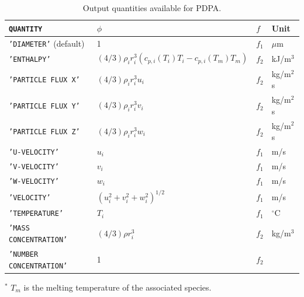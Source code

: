 \documentclass[11pt]{book}
\newcommand{\ct}{\tt\small}
\begin{document}
\begin{table}[!ht]
\caption[Output quantities available for PDPA]{Output quantities available for PDPA.}
\label{tbl:pdpa}
\begin{center}
\begin{tabular}{|l|l|l|l|}
\hline
{\ct QUANTITY}              & $\phi$                                                                & $f$    & Unit \\ \hline
{\ct 'DIAMETER'} (default)  & 1                                                                     & $f_1$  & $\mu$m \\
{\ct 'ENTHALPY'}            & $(4/3)\rho_i r_i^3 \left(c_{p,i}(T_i)T_i-c_{p,i}(T_m)T_m \right)$     & $f_2$  & kJ/m$^3$ \\
{\ct 'PARTICLE FLUX X'}     & $(4/3)\rho_i r_i^3 u_i$                                               & $f_2$  & kg/m$^2$s \\
{\ct 'PARTICLE FLUX Y'}     & $(4/3)\rho_i r_i^3 v_i$                                               & $f_2$  & kg/m$^2$s \\
{\ct 'PARTICLE FLUX Z'}     & $(4/3)\rho_i r_i^3 w_i$                                               & $f_2$  & kg/m$^2$s \\
{\ct 'U-VELOCITY'}          & $u_i$                                                                 & $f_1$  & m/s \\
{\ct 'V-VELOCITY'}          & $v_i$                                                                 & $f_1$  & m/s \\
{\ct 'W-VELOCITY'}          & $w_i$                                                                 & $f_1$  & m/s \\
{\ct 'VELOCITY'}            & $(u_i^2+v_i^2+w_i^2)^{1/2}$                                           & $f_1$  & m/s \\
{\ct 'TEMPERATURE'}         & $T_i$                                                                 & $f_1$  & ${}^\circ$C \\
{\ct 'MASS CONCENTRATION'}  & $(4/3)\rho r_i^3 $                                                    & $f_2$  & kg/m$^3$ \\
{\ct 'NUMBER CONCENTRATION'}& 1                                                                     & $f_2$  & \\
 \hline
\end{tabular}
\end{center}
${}^*$ $T_m$ is the melting temperature of the associated species.
\end{table}
\end{document}
